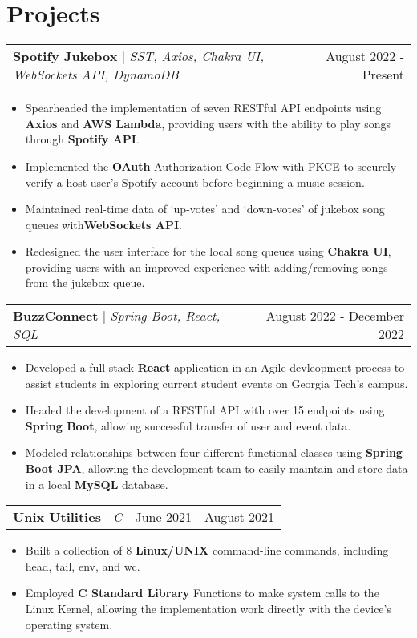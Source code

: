 \documentclass[letterpaper,11pt]{article}
\makeatletter
\newcommand{\resumeProjectHeading}[3]{
    \begin{tabular*}{0.97\textwidth}[t]{l@{\extracolsep{\fill}}r}
      \textbf{#1} $\vert$ \textit{#2}  & {#3}
    \end{tabular*}\vspace{-3pt}
}
\newcommand{\resumeItemListStart}{\begin{itemize}[noitemsep]\vspace{-4pt}}
\newcommand{\resumeItemListEnd}{\end{itemize}}
\makeatother
\begin{document}
\section{Projects}
    \resumeProjectHeading{Spotify Jukebox}{SST, Axios, Chakra UI, WebSockets API, DynamoDB}{August 2022 - Present}
      \resumeItemListStart
        \item {Spearheaded the implementation of seven RESTful API endpoints using \textbf{Axios} and \textbf{AWS Lambda}, providing users with the ability to play songs through \textbf{Spotify API}.}
        \item {Implemented the \textbf{OAuth} Authorization Code Flow with PKCE to securely verify a host user's Spotify account before beginning a music session.}
        \item {Maintained real-time data of `up-votes' and `down-votes' of jukebox song queues with\textbf{WebSockets API}.}
        \item {Redesigned the user interface for the local song queues using \textbf{Chakra UI}, providing users with an improved experience with adding/removing songs from the jukebox queue.}
      \resumeItemListEnd

    \resumeProjectHeading{BuzzConnect}{Spring Boot, React, SQL}{August 2022 - December 2022}
      \resumeItemListStart
        \item {Developed a full-stack \textbf{React} application in an Agile devleopment process to assist students in exploring current student events on Georgia Tech's campus.}
        \item {Headed the development of a RESTful API with over 15 endpoints using \textbf{Spring Boot}, allowing successful transfer of user and event data.}
        \item {Modeled relationships between four different functional classes using \textbf{Spring Boot JPA}, allowing the development team to easily maintain and store data in a local \textbf{MySQL} database.}
      \resumeItemListEnd

    \resumeProjectHeading{Unix Utilities}{C}{June 2021 - August 2021}
      \resumeItemListStart
        \item {Built a collection of 8 \textbf{Linux/UNIX} command-line commands, including head, tail, env, and wc.}
        \item {Employed \textbf{C Standard Library} Functions to make system calls to the Linux Kernel, allowing the implementation work directly with the device's operating system.}
      \resumeItemListEnd
\end{document}
